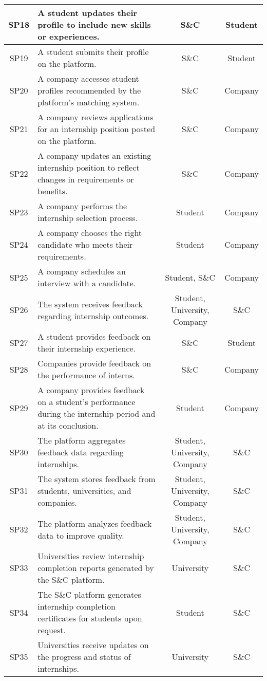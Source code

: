 \begin{longtable}{|c|p{5cm}|c|c|}
SP18 & A student updates their profile to include new skills or experiences. & S\&C & Student \\ \hline
SP19 & A student submits their profile on the platform. & S\&C & Student \\ \hline
SP20 & A company accesses student profiles recommended by the platform’s matching system. & S\&C & Company \\ \hline

SP21 & A company reviews applications for an internship position posted on the platform. & S\&C & Company \\ \hline
SP22 & A company updates an existing internship position to reflect changes in requirements or benefits. & S\&C & Company \\ \hline
SP23 & A company performs the internship selection process. & Student & Company \\ \hline
SP24 & A company chooses the right candidate who meets their requirements. & Student & Company \\ \hline
SP25 & A company schedules an interview with a candidate. & Student, S\&C & Company \\ \hline

SP26 & The system receives feedback regarding internship outcomes. & Student, University, Company & S\&C \\ \hline
SP27 & A student provides feedback on their internship experience. & S\&C & Student \\ \hline
SP28 & Companies provide feedback on the performance of interns. & S\&C & Company \\ \hline
SP29 & A company provides feedback on a student's performance during the internship period and at its conclusion. & Student & Company \\ \hline
SP30 & The platform aggregates feedback data regarding internships. & Student, University, Company & S\&C \\ \hline
SP31 & The system stores feedback from students, universities, and companies. & Student, University, Company & S\&C \\ \hline
SP32 & The platform analyzes feedback data to improve quality. & Student, University, Company & S\&C \\ \hline

SP33 & Universities review internship completion reports generated by the S\&C platform. & University & S\&C \\ \hline
SP34 & The S\&C platform generates internship completion certificates for students upon request. & Student & S\&C \\ \hline
SP35 & Universities receive updates on the progress and status of internships. & University & S\&C \\ \hline


\end{longtable}

